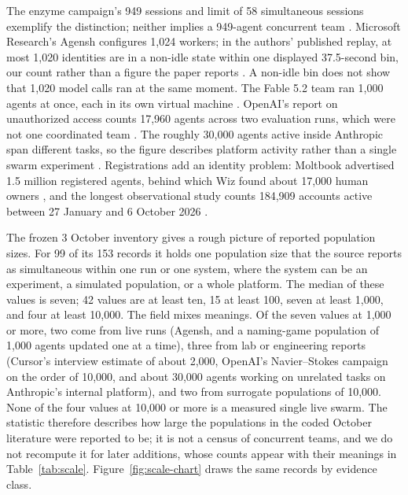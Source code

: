 The enzyme campaign's 949 sessions and limit of 58 simultaneous sessions exemplify the distinction; neither implies a 949-agent concurrent team \citep{anthropic-art-enzymes}. Microsoft Research's Agensh configures 1,024 workers; in the authors' published replay, at most 1,020 identities are in a non-idle state within one displayed 37.5-second bin, our count rather than a figure the paper reports \citep{agensh-1024}. A non-idle bin does not show that 1,020 model calls ran at the same moment. The Fable 5.2 team ran 1,000 agents at once, each in its own virtual machine \citep{anthropic-fable-team-scaling}. OpenAI's report on unauthorized access counts 17,960 agents across two evaluation runs, which were not one coordinated team \citep{openai-peers-unauthorized-access}. The roughly 30,000 agents active inside Anthropic span different tasks, so the figure describes platform activity rather than a single swarm experiment \citep{anthropic-institute-pace}. Registrations add an identity problem: Moltbook advertised 1.5 million registered agents, behind which Wiz found about 17,000 human owners \citep{wiz-moltbook}, and the longest observational study counts 184,909 accounts active between 27 January and 6 October 2026 \citep{moltbook-collective-behavior}.

The frozen 3 October inventory gives a rough picture of reported population sizes. For 99 of its 153 records it holds one population size that the source reports as simultaneous within one run or one system, where the system can be an experiment, a simulated population, or a whole platform. The median of these values is seven; 42 values are at least ten, 15 at least 100, seven at least 1,000, and four at least 10,000. The field mixes meanings. Of the seven values at 1,000 or more, two come from live runs (Agensh, and a naming-game population of 1,000 agents updated one at a time), three from lab or engineering reports (Cursor's interview estimate of about 2,000, OpenAI's Navier--Stokes campaign on the order of 10,000, and about 30,000 agents working on unrelated tasks on Anthropic's internal platform), and two from surrogate populations of 10,000. None of the four values at 10,000 or more is a measured single live swarm. The statistic therefore describes how large the populations in the coded October literature were reported to be; it is not a census of concurrent teams, and we do not recompute it for later additions, whose counts appear with their meanings in Table~\ref{tab:scale}. Figure~\ref{fig:scale-chart} draws the same records by evidence class.

